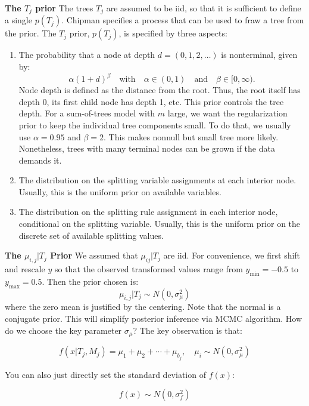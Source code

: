 \documentclass[a4paper,11pt]{article}
\begin{document}
\textbf{The $T_j$ prior}
The trees $T_j$ are assumed to be iid, so that it is sufficient to define a single $p(T_j)$. Chipman specifies a process 
 that can be used to fraw a tree from the prior. The \( T_j \) prior, \( p(T_j) \), is specified by three aspects:
\begin{enumerate}
    \item The probability that a node at depth \( d = (0, 1, 2, \ldots) \) is nonterminal, given by:
    \[
    \alpha (1 + d)^\beta \quad \text{with} \quad \alpha \in (0, 1) \quad \text{and} \quad \beta \in [0, \infty).
    \]
    Node depth is defined as the distance from the root. Thus, the root itself has depth 0, its first child node has depth 1, etc. This prior controls the tree depth. For a sum-of-trees model with \( m \) large, we want the regularization prior to keep the individual tree components small. To do that, we usually use \( \alpha = 0.95 \) and \( \beta = 2 \).  This makes nonnull but small tree more likely. Nonetheless,  trees with many terminal nodes can be grown if the data demands it.
    
    \item The distribution on the splitting variable assignments at each interior node. Usually, this is the uniform prior on available variables.
    
    \item The distribution on the splitting rule assignment in each interior node, conditional on the splitting variable. Usually, this is the uniform prior on the discrete set of available splitting values.
\end{enumerate}

\textbf{The \( \mu_{i,j} | T_j \) Prior}
We assumed that $\mu_{ij} | T_j$ are iid. For convenience, we first shift and rescale \( y \) so that the observed transformed values range from \( y_{\text{min}} = -0.5 \) to \( y_{\text{max}} = 0.5 \). Then the  prior chosen is:
\[
\mu_{i,j}| T_j \sim N(0, \sigma_\mu^2)
\]
where the zero mean is justified by the centering.  Note that the normal is a conjugate prior. This will simplify posterior inference via MCMC algorithm.
How do we choose the key parameter \( \sigma_\mu \)?
The key observation is that:

\[
f(x | T_j, M_j) = \mu_1 + \mu_2 + \cdots + \mu_{b_j}, \quad \mu_i \sim N(0, \sigma_\mu^2)
\]

You can also just directly set the standard deviation of \( f(x) \):

\[
f(x) \sim N(0, \sigma_f^2)
\]
\end{document}
